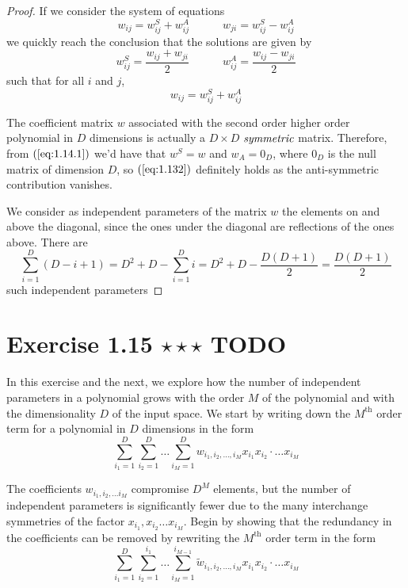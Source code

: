 \vspace{1em}

\begin{proof}
    If we consider the system of equations
    \[
        w_{ij} = w_{ij}^S + w_{ij}^A 
        \hspace{3em}
        w_{ji} = w_{ij}^S - w_{ij}^A
    \]
    we quickly reach the conclusion that the solutions are given by
    \begin{equation}\label{eq:1.14.1}\tag{1.14.1}
        w_{ij}^S = \frac{w_{ij} + w_{ji}}{2}
        \hspace{3em}
        w_{ij}^A = \frac{w_{ij} - w_{ji}}{2}
    \end{equation}
    such that for all $i$ and $j$, 
    \[
        w_{ij} = w_{ij}^S + w_{ij}^A 
    \] 

    The coefficient matrix $w$ associated with the second order higher order polynomial 
    in $D$ dimensions is actually a $D \times D$ $\emph{symmetric}$ matrix. Therefore, from
    $(\ref{eq:1.14.1})$ we'd have that $w^S = w$ and $w_A = 0_D$, where $0_D$ is the null
    matrix of dimension $D$, so $(\ref{eq:1.132})$ definitely holds as the anti-symmetric
    contribution vanishes.

    We consider as independent parameters of the matrix $w$ the elements on and above the diagonal,
    since the ones under the diagonal are reflections of the ones above. There are  
    \[
        \sum_{i=1}^{D} (D - i + 1) = D^2 + D - \sum_{i=1}^{D} i = D^2 + D - \frac{D(D+1)}{2} = \frac{D(D+1)}{2}
    \] 
    such independent parameters
\end{proof}

\section*{Exercise 1.15 $\star \star \star$ TODO}
In this exercise and the next, we explore how the number of independent
parameters in a polynomial grows with the order $M$ of the polynomial and with
the dimensionality $D$ of the input space. We start by writing down the $M^{\text{th}}$ order
term for a polynomial in $D$ dimensions in the form
\begin{equation}\label{eq:1.133}\tag{1.133}
    \sum_{i_1=1}^{D} \sum_{i_2=1}^{D} \ldots \sum_{i_M=1}^{D} 
        w_{i_1,i_2,\ldots,i_M}x_{i_1}x_{i_2} \cdot \ldots x_{i_M} 
\end{equation}

The coefficients $w_{i_1, i_2, \ldots i_M}$ compromise $D^M$ elements, but the number
of independent parameters is significantly fewer due to the many interchange symmetries
of the factor $x_{i_1}, x_{i_2} \ldots x_{i_M}$. Begin by showing that the redundancy in the
coefficients can be removed by rewriting the $M^\text{th}$ order term in the form
\begin{equation}\label{eq:1.134}\tag{1.134}
    \sum_{i_1=1}^{D} \sum_{i_2=1}^{i_1} \ldots \sum_{i_M=1}^{i_{M-1}} 
        \widetilde{w}_{i_1,i_2,\ldots,i_M}x_{i_1}x_{i_2} \cdot \ldots x_{i_M} 
\end{equation}


